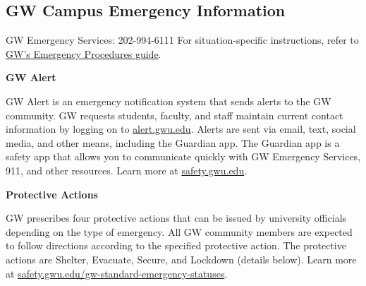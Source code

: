 \documentclass[12pt,letterpaper]{article}
\begin{document}
\subsection*{GW Campus Emergency Information}
GW Emergency Services: 202-994-6111
For situation-specific instructions, refer to
\href{https://safety.gwu.edu/emergency-response-handbook}{GW's
Emergency Procedures guide}.

\textbf{GW Alert}

GW Alert is an emergency notification system that sends alerts to the
GW community. GW requests students, faculty, and staff maintain
current contact information by logging on to
\href{https://alert.gwu.edu}{alert.gwu.edu}. Alerts are sent via
email, text, social media, and other means, including the Guardian
app. The Guardian app is a safety app that allows you to communicate
quickly with GW Emergency Services, 911, and other resources. Learn
more at \href{https://safety.gwu.edu}{safety.gwu.edu}.

\textbf{Protective Actions}

GW prescribes four protective actions that can be issued by
university officials depending on the type of emergency. All GW
community members are expected to follow directions according to the
specified protective action. The protective actions are Shelter,
Evacuate, Secure, and Lockdown (details below). Learn more at
\href{https://safety.gwu.edu/gw-standard-emergency-statuses}{safety.gwu.edu/gw-standard-emergency-statuses}.
\end{document}
